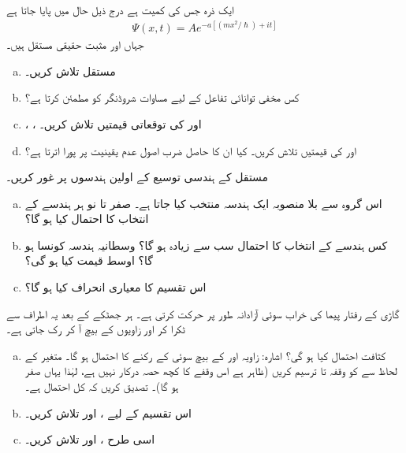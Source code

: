 ایک ذرہ جس کی کمیت  ہے درج ذیل حال میں پایا جاتا ہے 
\begin{align*}
\Psi (x,t)=Ae^{-a[(mx^{2}/\hslash)+it]}
\end{align*}
جہاں  اور  مثبت حقیقی مستقل ہیں۔
\begin{enumerate}[a.]
\item
مستقل  تلاش کریں۔
\item
کس مخفی توانائی تفاعل  کے لیے  مساوات شروڈنگر کو مطمئن کرتا ہے؟
\item
{}، ،  اور  کی توقعاتی قیمتیں تلاش کریں۔
\item
{} اور  کی قیمتیں تلاش کریں۔ کیا ان کا حاصل ضرب اصول عدم یقینیت پر پورا اترتا  ہے؟
\end{enumerate}
مستقل  کے  ہندسی  توسیع  کے اولین  ہندسوں   پر غور کریں۔
\begin{enumerate}[a.]
\item
اس گروہ سے بلا منصوبہ ایک ہندسہ  منتخب کیا جاتا ہے۔ صفر تا نو ہر ہندسے  کے انتخاب کا احتمال کیا ہو گا؟
\item
 کس ہندسے کے انتخاب کا احتمال سب سے زیادہ ہو گا؟ وسطانیہ ہندسہ کونسا ہو گا؟ اوسط قیمت کیا ہو گی؟
\item
اس تقسیم کا معیاری انحراف کیا ہو گا؟
\end{enumerate}
گاڑی کے  رفتار پیما کی خراب سوئی آزادانہ  طور پر حرکت کرتی ہے۔ ہر جھٹکے کے بعد یہ اطراف سے ٹکرا کر  اور  زاویوں کے بیچ آ کر رک جاتی ہے۔
\begin{enumerate}[a.] 
\item

کثافت احتمال  کیا ہو گی؟ اشارہ: زاویہ  اور  کے بیچ سوئی کے  رکنے کا احتمال  ہو گا۔ متغیر  کے لحاظ سے  کو وقفہ تا  ترسیم کریں (ظاہر ہے اس وقفے کا    کچھ حصہ  درکار نہیں   ہے،   لہٰذا   یہاں  صفر  ہو گا)۔ تصدیق کریں  کہ کل احتمال  ہے۔
\item
اس تقسیم کے لیے ،  اور  تلاش  کریں۔
\item
 اسی طرح ،  اور  تلاش کریں۔
\end{enumerate}

